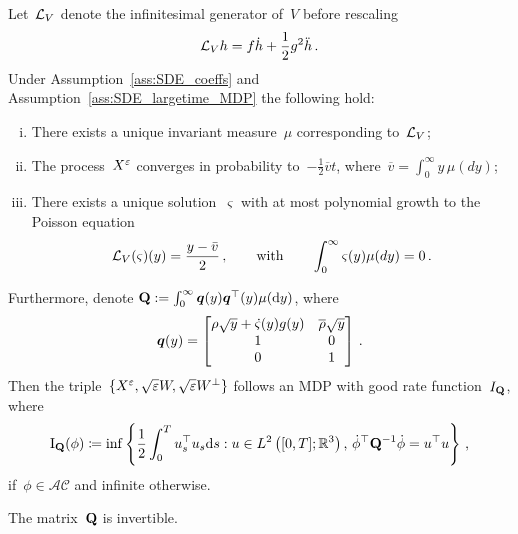 \begin{theorem}\label{thm:limitPoisson}
Let~$\mathcal{L}_{V}$ denote the infinitesimal generator of~$V$ before rescaling
\[
\mathcal{L}_V h = f\dot{h} + \frac{1}{2}g^2\ddot{h}\,.
\]
Under Assumption~\ref{ass:SDE_coeffs} and Assumption~\ref{ass:SDE_largetime_MDP} the following hold:
\begin{enumerate}[i)]
    \item There exists a unique invariant measure~$\mu$ corresponding to~$\mathcal{L}_V$;
    \item The process~$X^{\varepsilon}$ converges in probability to~$-\frac{1}{2}\overline{v}t$, where~$\overline{v} = \int_0^\infty y \, \mu(dy)$;
    \item There exists a unique solution~$\varsigma$ with at most polynomial growth to the Poisson equation
    \[
    \mathcal{L}_V(\varsigma)(y) = \frac{y - \bar{v}}{2}\,, 
    \qquad \text{with} \qquad \int_0^\infty \varsigma(y)\mu(dy)=0\,.
    \]
\end{enumerate}
Furthermore, denote 
$\boldsymbol{\mathrm{Q}}:=\int_0^\infty\boldsymbol{q}(y)\boldsymbol{q}^\top(y)\mu(\mathrm{d} y)$, where
$$
\boldsymbol{q}(y) =
\begin{bmatrix}
\rho\sqrt{y} + \dot{\varsigma}(y)g(y) & \overline{\rho}\sqrt{y}\\
1 & 0 \\
0 & 1 \\
\end{bmatrix}\,.
$$
Then the triple~$\{X^{\varepsilon},\sqrt{\varepsilon}W,\sqrt{\varepsilon}W^{\perp}\}$ follows an MDP with good rate function~$I_{\boldsymbol{\mathrm{Q}}}$,
where
$$
\mathrm{I}_{\boldsymbol{\mathrm{Q}}}(\phi) \coloneqq 
\inf \left\{\frac{1}{2}\int_0^T u_s^\top u_s\mathrm{d} s: u\in L^2\left([0,T]; \mathbb{R}^3\right), \, \dot{\phi}^\top \boldsymbol{\mathrm{Q}}^{-1} \dot{\phi} = u^\top u \right\}\,,
$$
if~$\phi\in\mathcal{AC}$ and infinite otherwise.
\end{theorem}
\begin{lemma}\label{q-invertible}
The matrix~$\boldsymbol{\mathrm{Q}}$ is invertible. 
\end{lemma}
